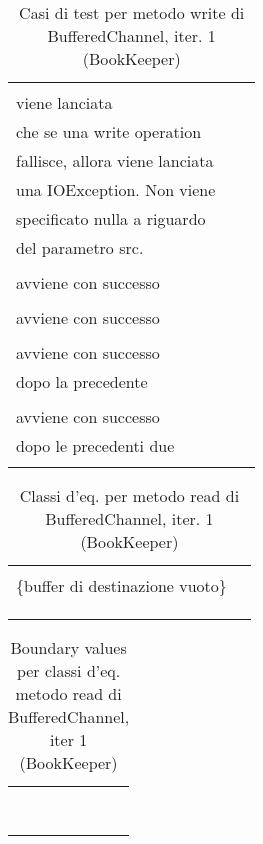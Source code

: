 \documentclass[10pt, a4paper]{article}
\newcommand{\Intmaketable}[4]{
	\begin{longtable}{#3}
	#4
	\caption{#2}
	\label{#1}
	\end{longtable}
}
\newcommand{\Intceqtable}[3]{
	\Intmaketable{#1}{#2}{|l|l|}{
	\hline
	\thead{Parametro formale} & \thead{Classi d'equivalenza} \\
	\hline
	\hline
	#3
	\hline}
}
\newcommand{\Intbvtable}[3]{
	\Intmaketable{#1}{#2}{|l|l|l|}{
	\hline
	\thead{Parametro formale} & \thead{Classe d'equivalenza} & \thead{Boundary value}\\
	\hline
	\hline
	#3
	\hline}
}
\newcommand{\Inttestctable}[3]{
	\Intmaketable{#1}{#2}{|l|l|l|}{
	\hline
	\thead{Input} & \thead{Esito atteso} & \thead{Motivazione}\\
	\hline
	\hline
	#3
	\hline}
}
\newcommand{\Intceqcaption}[4]{Classi d'eq. per metodo #1 di #2, iter. #3 (#4)}
\newcommand{\Intbvcaption}[4]{Boundary values per classi d'eq. metodo #1 di #2, iter #3 (#4)}
\newcommand{\Inttestccaption}[4]{Casi di test per metodo #1 di #2, iter. #3 (#4)}
\newcommand{\gettablelabel}[5]{table:#1:#2:#3:iter#4:proj#5}
\newcommand{\ceqtable}[5]{
	\Intceqtable{\gettablelabel{ceq}{#1}{#2}{#3}{#4}}
		{\Intceqcaption{#1}{#2}{#3}{#4}}
		{#5}
}
\newcommand{\bvtable}[5]{
	\Intbvtable{\gettablelabel{bv}{#1}{#2}{#3}{#4}}
		{\Intbvcaption{#1}{#2}{#3}{#4}}
		{#5}
}
\newcommand{\testctable}[5]{
	\Inttestctable{\gettablelabel{testc}{#1}{#2}{#3}{#4}}
		{\Inttestccaption{#1}{#2}{#3}{#4}}
		{#5}
}
\newcommand{\tcell}{\makecell[tl]}
\newcommand{\newtrow}{\\ \hline}
\def\bookkeeper{BookKeeper}
\newcommand{\ceq}[1]{\{#1\}}
\begin{document}
	\testctable{write}{BufferedChannel}{1}{\bookkeeper}{
			\tcell{null} & 
			\tcell{NullPointerException\\ viene lanciata} & 
			\tcell{
				La documentazione specifica\\ 
				che se una write operation\\
				fallisce, allora viene lanciata\\
				una IOException. Non viene\\
				specificato nulla a riguardo\\
				del parametro src.}
		\newtrow
			\tcell{ByteBuf("")} & 
			\tcell{
				La scrittura nel buffer\\ 
				avviene con successo} & 
			\tcell{}
		\newtrow
			\tcell{ByteBuf("random data")} &
			\tcell{
				La scrittura nel buffer\\ 
				avviene con successo} &
			\tcell{}
		\newtrow
			\tcell{ByteBuf("more random data")} &
			\tcell{
				La scrittura nel buffer\\ 
				avviene con successo\\
				dopo la precedente} &
			\tcell{}
		\newtrow
			\tcell{ByteBuf("again random data")} &
			\tcell{
				La scrittura nel buffer\\ 
				avviene con successo\\
				dopo le precedenti due} &
			\tcell{}
		\newtrow
	}
	
	\newpage
	
	\ceqtable{read}{BufferedChannel}{1}{\bookkeeper}{
			\tcell{dest} & \tcell{\ceq{null}\\\ceq{buffer di destinazione vuoto}}
		\newtrow
			\tcell{pos} & \tcell{\ceq{$< 0$},\ceq{$\ge 0$}}
		\newtrow
			\tcell{length} & \tcell{\ceq{$< 0$}, \ceq{$0$}, \ceq{$\ge 1$}}
		\newtrow
	}
	
	\bvtable{read}{BufferedChannel}{1}{\bookkeeper}{
			\tcell{dest} & \tcell{\ceq{null}} & \tcell{null}
		\newtrow
			\tcell{dest} & \tcell{\ceq{buffer di destinazione vuoto}} & \tcell{ByteBuf()}
		\newtrow
			\tcell{pos} & \tcell{\ceq{$< 0$}} & \tcell{$-1$}
		\newtrow
			\tcell{pos} & \tcell{\ceq{$\ge 0$}} & \tcell{$0$}
		\newtrow
			\tcell{length} & \tcell{\ceq{$< 0$}} & \tcell{$-1$}
		\newtrow
			\tcell{length} & \tcell{\ceq{$0$}} & \tcell{$0$}
		\newtrow
			\tcell{length} & \tcell{\ceq{$\ge 1$}} & \tcell{1}
		\newtrow
	}
	
\end{document}
